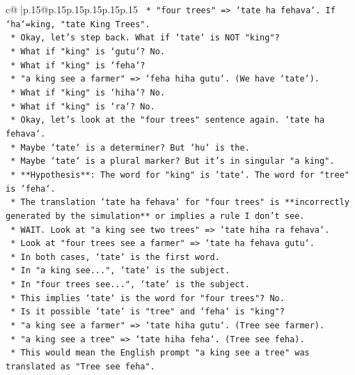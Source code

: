 \documentclass{article}
\begin{document}
{\begin{supertabular}{c@{$\;$}|p{.15\linewidth}@{}p{.15\linewidth}p{.15\linewidth}p{.15\linewidth}p{.15\linewidth}p{.15\linewidth}}
{{{\texttt{            *   "four trees" => `tate ha fehava`. If `ha`=king, "tate King Trees".} \\
\texttt{        *   Okay, let's step back. What if `tate` is NOT "king"?} \\
\texttt{        *   What if "king" is `gutu`? No.} \\
\texttt{        *   What if "king" is `feha`?} \\
\texttt{            *   "a king see a farmer" => `feha hiha gutu`. (We have `tate`).} \\
\texttt{        *   What if "king" is `hiha`? No.} \\
\texttt{        *   What if "king" is `ra`? No.} \\
\texttt{        *   Okay, let's look at the "four trees" sentence again. `tate ha fehava`.} \\
\texttt{        *   Maybe `tate` is a determiner? But `hu` is the.} \\
\texttt{        *   Maybe `tate` is a plural marker? But it's in singular "a king".} \\
\texttt{        *   **Hypothesis**: The word for "king" is `tate`. The word for "tree" is `feha`.} \\
\texttt{        *   The translation `tate ha fehava` for "four trees" is **incorrectly generated by the simulation** or implies a rule I don't see.} \\
\texttt{        *   WAIT. Look at "a king see two trees" => `tate hiha ra fehava`.} \\
\texttt{        *   Look at "four trees see a farmer" => `tate ha fehava gutu`.} \\
\texttt{        *   In both cases, `tate` is the first word.} \\
\texttt{        *   In "a king see...", `tate` is the subject.} \\
\texttt{        *   In "four trees see...", `tate` is the subject.} \\
\texttt{        *   This implies `tate` is the word for "four trees"? No.} \\
\texttt{        *   Is it possible `tate` is "tree" and `feha` is "king"?} \\
\texttt{            *   "a king see a farmer" => `tate hiha gutu`. (Tree see farmer).} \\
\texttt{            *   "a king see a tree" => `tate hiha feha`. (Tree see feha).} \\
\texttt{            *   This would mean the English prompt "a king see a tree" was translated as "Tree see feha".} \\
}}}
\end{supertabular}}
\end{document}
